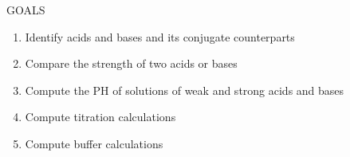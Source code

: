 \documentclass[main.tex]{subfiles}
\begin{document}
\begin{marginfigure}%
\begin{mytcbox}{GOALS}

\begin{enumerate}[label=\protect\circled{\color{white}\arabic*}]
\item Identify acids and bases and its conjugate counterparts
\item Compare the strength of two acids or bases
\item Compute the PH of solutions of weak and strong acids and bases
\item Compute titration calculations
\item Compute buffer calculations
\end{enumerate}
\end{mytcbox}
\vspace{1cm}
\begin{tcolorbox}[enhanced,colback=red!5!white,colframe=black!50!red,boxrule=1pt,
  arc=0pt,outer arc=0pt,drop heavy lifted shadow]
\faGears\ 
 {\discussionAB} \end{tcolorbox}

\end{marginfigure}%
\end{document}
